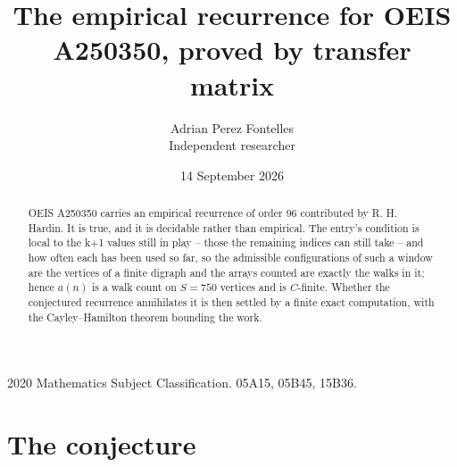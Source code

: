 \documentclass[11pt,a4paper]{article}
\title{The empirical recurrence for OEIS A250350, proved by transfer matrix}
\author{Adrian Perez Fontelles\\ \small Independent researcher}
\date{14 September 2026}
\theoremstyle{plain}
\theoremstyle{definition}
\begin{document}
\maketitle

\begin{abstract}
OEIS A250350 carries an empirical recurrence of order $96$ contributed by R. H. Hardin. It is
true, and it is decidable rather than empirical. The entry's condition is local to the k+1 values still in play -- those the remaining indices can still take -- and how often each has been used so far, so
the admissible configurations of such a window are the vertices of a finite digraph and the
arrays counted are exactly the walks in it; hence $a(n)$ is a walk count on $S=750$ vertices
and is $C$-finite. Whether the conjectured recurrence annihilates it is then settled by a
finite exact computation, with the Cayley--Hamilton theorem bounding the work.
\end{abstract}

\noindent\small 2020 Mathematics Subject Classification. 05A15, 05B45, 15B36.\normalsize

\section{The conjecture}
\end{document}
